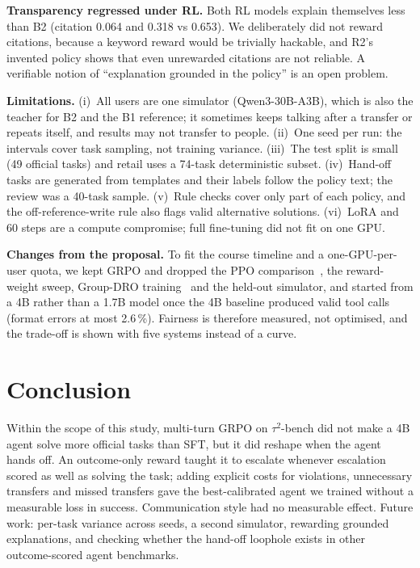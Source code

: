 \documentclass[12pt,a4paper]{article}
\newcommand{\tautwo}{$\tau^2$-bench}
\begin{document}
\textbf{Transparency regressed under RL.} Both RL models explain themselves
less than B2 (citation 0.064 and 0.318 vs 0.653). We deliberately did not
reward citations, because a keyword reward would be trivially hackable, and
R2's invented policy shows that even unrewarded citations are not reliable.
A verifiable notion of ``explanation grounded in the policy'' is an open
problem.

\textbf{Limitations.} (i)~All users are one simulator (Qwen3-30B-A3B), which
is also the teacher for B2 and the B1 reference; it sometimes keeps talking
after a transfer or repeats itself, and results may not transfer to people.
(ii)~One seed per run: the intervals cover task sampling, not training
variance. (iii)~The test split is small (49 official tasks) and retail uses a
74-task deterministic subset. (iv)~Hand-off tasks are generated from templates
and their labels follow the policy text; the review was a 40-task sample.
(v)~Rule checks cover only part of each policy, and the off-reference-write
rule also flags valid alternative solutions. (vi)~LoRA and 60 steps are a
compute compromise; full fine-tuning did not fit on one GPU.

\textbf{Changes from the proposal.} To fit the course timeline and a
one-GPU-per-user quota, we kept GRPO and dropped the PPO
comparison~\cite{schulman2017}, the reward-weight sweep, Group-DRO
training~\cite{sagawa2019} and the held-out simulator, and started from a 4B
rather than a 1.7B model once the 4B baseline produced valid tool calls
(format errors at most 2.6\,\%). Fairness is therefore measured, not
optimised, and the trade-off is shown with five systems instead of a curve.

\section{Conclusion}

Within the scope of this study, multi-turn GRPO on \tautwo{} did not make a
4B agent solve more official tasks than SFT, but it did reshape when the agent
hands off. An outcome-only reward taught it to escalate whenever escalation
scored as well as solving the task; adding explicit costs for violations,
unnecessary transfers and missed transfers gave the best-calibrated agent we
trained without a measurable loss in success. Communication style had no
measurable effect. Future work: per-task variance across seeds, a second
simulator, rewarding grounded explanations, and checking whether the hand-off
loophole exists in other outcome-scored agent benchmarks.
\end{document}
